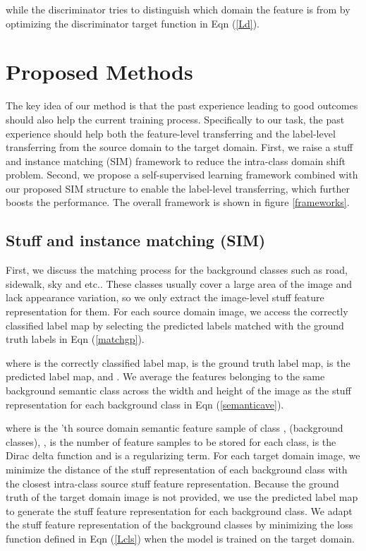 \documentclass[10pt,twocolumn,letterpaper]{article}
\begin{document}
while the discriminator tries to distinguish which domain the feature is from by optimizing the discriminator target function in Eqn (\ref{Ld}).
\vspace{-2mm}


\section{Proposed Methods}


The key idea of our method is that the past experience leading to good outcomes should also help the current training process. Specifically to our task, the past experience should help both the feature-level transferring and the label-level transferring from the source domain to the target domain. First, we raise a stuff and instance matching (SIM) framework to reduce the intra-class domain shift problem. Second, we propose a self-supervised learning framework combined with our proposed SIM structure to enable the label-level transferring, which further boosts the performance. The overall framework is shown in figure \ref{frameworks}.

\subsection{Stuff and instance matching (SIM)}
\label{section32}


First, we discuss the matching process for the background classes such as road, sidewalk, sky and etc.. These classes usually cover a large area of the image and lack appearance variation, so we only extract the image-level stuff feature representation for them. For each source domain image, we access the correctly classified label map by selecting the predicted labels matched with the ground truth labels in Eqn (\ref{matchgp}). 
\vspace{-2mm}

where  is the correctly classified label map,  is the ground truth label map,  is the predicted label map, and . We average the features belonging to the same background semantic class across the width and height of the image as the stuff representation for each background class in Eqn (\ref{semanticave}).
\vspace{-2mm}

where  is the 'th source domain semantic feature sample of class ,  (background classes), ,  is the number of feature samples to be stored for each class,  is the Dirac delta function and  is a regularizing term. For each target domain image, we minimize the distance of the stuff representation of each background class with the closest intra-class source stuff feature representation. Because the ground truth of the target domain image is not provided, we use the predicted label map to generate the stuff feature representation for each background class. We adapt the stuff feature representation of the background classes by minimizing the loss function defined in Eqn (\ref{Lcls}) when the model is trained on the target domain.
\vspace{-2mm}
\end{document}
